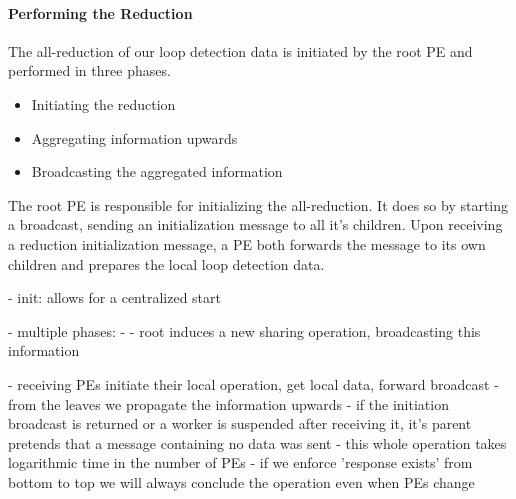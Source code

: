 \paragraph{Performing the Reduction}
The all-reduction of our loop detection data is initiated by the root PE and performed in three phases. 
\begin{itemize}
	\item Initiating the reduction
	\item Aggregating information upwards
	\item Broadcasting the aggregated information
\end{itemize}
The root PE is responsible for initializing the all-reduction. It does so by starting a broadcast, sending an initialization message to all it's children. Upon receiving a reduction initialization message, a PE both forwards the message to its own children and prepares the local loop detection data. 

- init: allows for a centralized start

- multiple phases:
	- 
- root induces a new sharing operation, broadcasting this information

- receiving PEs initiate their local operation, get local data, forward broadcast
- from the leaves we propagate the information upwards
- if the initiation broadcast is returned or a worker is suspended after receiving it, it's parent pretends that a message containing no data was sent
- this whole operation takes logarithmic time in the number of PEs
- if we enforce 'response exists' from bottom to top we will always conclude the operation even when PEs change

